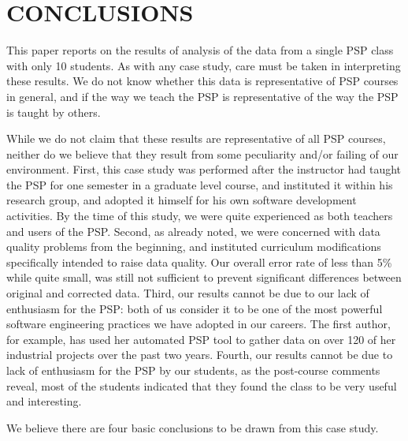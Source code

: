 
\section{CONCLUSIONS}

This paper reports on the results of analysis of the data from a single PSP 
class with only 10 students.  As with any case study, care must be taken
in interpreting these results.  We do not know whether this data is 
representative of PSP courses in general, and if the way we teach the
PSP is representative of the way the PSP is taught by others. 

While we do not claim that these results are representative of all PSP
courses, neither do we believe that they result from some peculiarity
and/or failing of our environment.  First, this case study was performed
after the instructor had taught the PSP for one semester in a graduate
level course, and instituted it within his research group, and adopted it
himself for his own software development activities.  By the time of this
study, we were quite experienced as both teachers and users of the PSP.
Second, as already noted, we were concerned with data quality problems from
the beginning, and instituted curriculum modifications specifically
intended to raise data quality. Our overall error rate of less than 5\%
while quite small, was still not sufficient to prevent significant
differences between original and corrected data. Third, our results cannot
be due to our lack of enthusiasm for the PSP: both of us consider it to be
one of the most powerful software engineering practices we have adopted in
our careers.  The first author, for example, has used her automated PSP
tool to gather data on over 120 of her industrial projects over the past
two years.  Fourth, our results cannot be due to lack of enthusiasm for the
PSP by our students, as the post-course comments reveal, most of the
students indicated that they found the class to be very useful and
interesting.

We believe there are four basic conclusions to be drawn from this case
study.  

